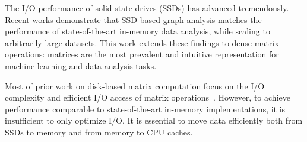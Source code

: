 

The I/O performance of solid-state drives (SSDs) has advanced tremendously.
Recent works \cite{flashgraph, gridgraph} demonstrate that SSD-based 
graph analysis matches the performance of 
state-of-the-art in-memory data analysis, while scaling to arbitrarily large datasets.
This work extends these findings to dense matrix operations: matrices are the most
prevalent and intuitive representation for machine learning and data analysis tasks.





Most of prior work on disk-based matrix computation focus on the I/O complexity
and efficient I/O access of matrix operations~\cite{Toledo99, Quintana-Orti12}.
However, to achieve performance comparable to state-of-the-art in-memory
implementations, it is insufficient to only optimize I/O. It is essential
to move data efficiently both from SSDs to memory and from memory to CPU
caches.


